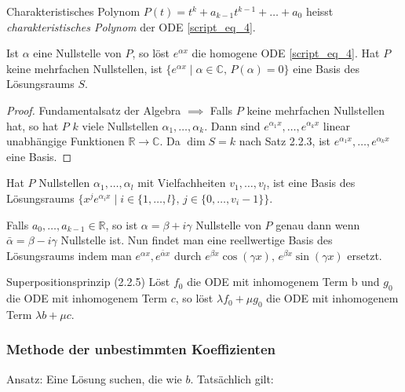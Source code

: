 \documentclass[a4paper,10pt]{article}
\def\R{\mathbb{R}}
\def\C{\mathbb{C}}
\begin{document}
\begin{mainbox}{Charakteristisches Polynom}
    \( P(t) = t^k + a_{k -1} t^{k - 1} + \dots + a_0 \) heisst \emph{charakteristisches Polynom} der ODE \eqref{script_eq_4}.
\end{mainbox}

\begin{subbox}{}
    Ist \( \alpha \) eine Nullstelle von \( P \), so löst \( e^{\alpha x} \) die homogene ODE \eqref{script_eq_4}. Hat \( P \) keine mehrfachen Nullstellen, ist \( \{ e^{\alpha x} \; | \; \alpha \in \C, \, P(\alpha) = 0 \} \) eine Basis des Lösungsraums \( S \).
\end{subbox}

\begin{proof}
    Fundamentalsatz der Algebra \( \implies \) Falls \( P \) keine mehrfachen Nullstellen hat, so hat \( P \) \( k \) viele Nullstellen \( \alpha_1, \dots, \alpha_k \). Dann sind \( e^{\alpha_1 x}, \dots, e^{\alpha_k x} \) linear unabhängige Funktionen \( \R \to \C \). Da \( \dim S = k \) nach Satz 2.2.3, ist \( e^{\alpha_1 x}, \dots, e^{\alpha_k x} \) eine Basis.
\end{proof}

\begin{subbox}{}
    Hat \( P \) Nullstellen \( \alpha_1, \dots, \alpha_l \) mit Vielfachheiten \( v_1, \dots, v_l \), ist eine Basis des Lösungsraums \( \{ x^j e^{\alpha_i x} \; | \; i \in \{ 1, \dots, l \}, \, j \in \{0, \dots, v_i - 1 \} \} \).
\end{subbox}

Falls \( a_0, \dots, a_{k - 1} \in \R \), so ist \( \alpha = \beta + i \gamma \) Nullstelle von \( P \) genau dann wenn \( \bar{\alpha} = \beta - i \gamma \) Nullstelle ist. Nun findet man eine reellwertige Basis des Lösungsraums indem man \( e^{\alpha x}, e^{\bar{\alpha} x} \) durch \( e^{\beta x} \cos(\gamma x), \, e^{\beta x} \sin(\gamma x) \) ersetzt.

\begin{subbox}{Superpositionsprinzip (2.2.5)}
    Löst \( f_0 \) die ODE mit inhomogenem Term b und \( g_0 \) die ODE mit inhomogenem Term \( c \), so löst \( \lambda f_0 + \mu g_0 \) die ODE mit inhomogenem Term \( \lambda b + \mu c \).
\end{subbox}

\subsubsection{Methode der unbestimmten Koeffizienten}
Ansatz: Eine Lösung suchen, die  wie \( b \). Tatsächlich gilt:
\end{document}
